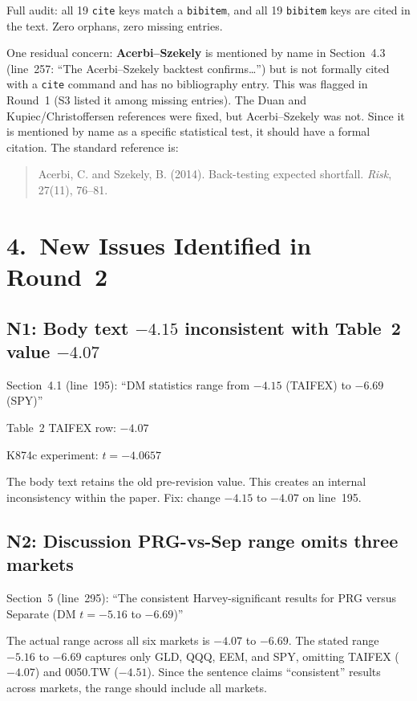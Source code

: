 \documentclass[12pt,a4paper]{article}
\begin{document}
\textcolor{okgreen}{Full audit: all 19 \texttt{cite} keys match a \texttt{bibitem}, and all 19 \texttt{bibitem} keys are cited in the text. Zero orphans, zero missing entries.}

\medskip
\noindent
One residual concern: \textbf{Acerbi--Szekely} is mentioned by name in Section~4.3 (line~257: ``The Acerbi--Szekely backtest confirms\ldots'') but is not formally cited with a \texttt{cite} command and has no bibliography entry. This was flagged in Round~1 (S3 listed it among missing entries). The Duan and Kupiec/Christoffersen references were fixed, but Acerbi--Szekely was not. Since it is mentioned by name as a specific statistical test, it should have a formal citation. The standard reference is:

\begin{quote}
\small
Acerbi, C. and Szekely, B. (2014). Back-testing expected shortfall. \emph{Risk}, 27(11), 76--81.
\end{quote}


\section*{4.\ New Issues Identified in Round~2}

\subsection*{\textcolor{errorred}{N1: Body text $-4.15$ inconsistent with Table~2 value $-4.07$}}

Section~4.1 (line~195): ``DM statistics range from $-4.15$ (TAIFEX) to $-6.69$ (SPY)''

Table~2 TAIFEX row: $-4.07$

K874c experiment: $t = -4.0657$

The body text retains the old pre-revision value. This creates an internal inconsistency within the paper. Fix: change $-4.15$ to $-4.07$ on line~195.

\subsection*{\textcolor{warncolor}{N2: Discussion PRG-vs-Sep range omits three markets}}

Section~5 (line~295): ``The consistent Harvey-significant results for PRG versus Separate (DM $t = -5.16$ to $-6.69$)''

The actual range across all six markets is $-4.07$ to $-6.69$. The stated range $-5.16$ to $-6.69$ captures only GLD, QQQ, EEM, and SPY, omitting TAIFEX ($-4.07$) and 0050.TW ($-4.51$). Since the sentence claims ``consistent'' results across markets, the range should include all markets.
\end{document}
